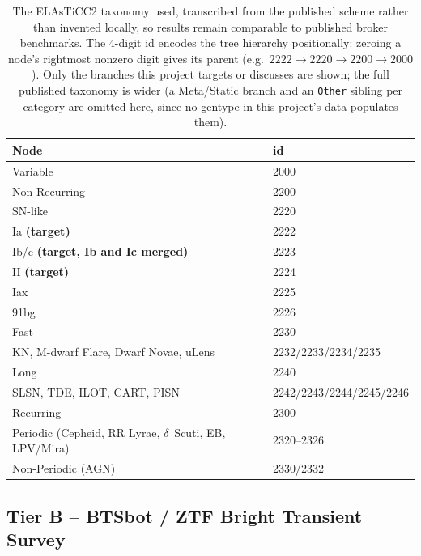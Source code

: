 \begin{table}[htb]
\centering
\caption{The ELAsTiCC2 taxonomy used, transcribed from the published
scheme rather than invented locally, so results remain comparable to
published broker benchmarks. The 4-digit id encodes the tree hierarchy
positionally: zeroing a node's rightmost nonzero digit gives its parent
(e.g.\ $2222 \to 2220 \to 2200 \to 2000$). Only the branches this project
targets or discusses are shown; the full published taxonomy is wider
(a Meta/Static branch and an \texttt{Other} sibling per category are
omitted here, since no gentype in this project's data populates them).}
\label{tab:taxonomy}
\scriptsize
\begin{tabular}{L{9cm}l}
\toprule
Node & id \\
\midrule
Variable & 2000 \\
\quad Non-Recurring & 2200 \\
\qquad SN-like & 2220 \\
\qquad\quad Ia \textbf{(target)} & 2222 \\
\qquad\quad Ib/c \textbf{(target, Ib and Ic merged)} & 2223 \\
\qquad\quad II \textbf{(target)} & 2224 \\
\qquad\quad Iax & 2225 \\
\qquad\quad 91bg & 2226 \\
\qquad Fast & 2230 \\
\qquad\quad KN, M-dwarf Flare, Dwarf Novae, uLens & 2232/2233/2234/2235 \\
\qquad Long & 2240 \\
\qquad\quad SLSN, TDE, ILOT, CART, PISN & 2242/2243/2244/2245/2246 \\
\quad Recurring & 2300 \\
\qquad Periodic (Cepheid, RR Lyrae, $\delta$~Scuti, EB, LPV/Mira) & 2320--2326 \\
\qquad Non-Periodic (AGN) & 2330/2332 \\
\bottomrule
\end{tabular}
\end{table}

\subsection{Tier B -- BTSbot / ZTF Bright Transient Survey}


